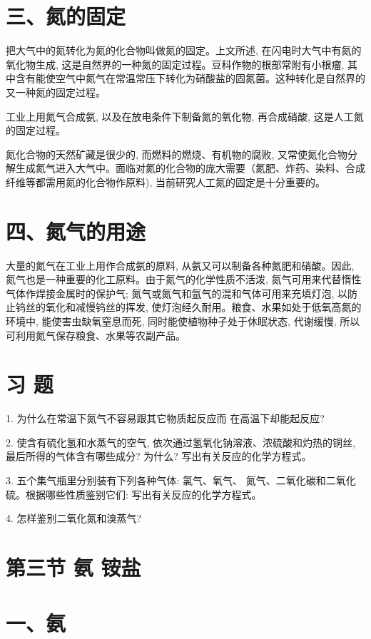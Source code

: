 \documentclass[10pt]{article}
\begin{document}
\section*{三、氮的固定}

把大气中的氮转化为氮的化合物叫做氮的固定。上文所述, 在闪电时大气中有氮的氧化物生成, 这是自然界的一种氮的固定过程。豆科作物的根部常附有小根瘤, 其中含有能使空气中氮气在常温常压下转化为硝酸盐的固氮菌。这种转化是自然界的又一种氮的固定过程。

工业上用氮气合成氨, 以及在放电条件下制备氮的氧化物, 再合成硝酸, 这是人工氮的固定过程。

氮化合物的天然矿藏是很少的, 而燃料的燃烧、有机物的腐败, 又常使氮化合物分解生成氮气进入大气中。面临对氮的化合物的庞大需要（氮肥、炸药、染料、合成纤维等都需用氮的化合物作原料), 当前研究人工氮的固定是十分重要的。

\section*{四、氮气的用途}

大量的氮气在工业上用作合成氨的原料, 从氨又可以制备各种氮肥和硝酸。因此, 氮气也是一种重要的化工原料。由于氮气的化学性质不活泼, 氮气可用来代替惰性气体作焊接金属时的保护气; 氮气或氮气和氩气的混和气体可用来充填灯泡, 以防止钨丝的氧化和减慢钨丝的挥发, 使灯泡经久耐用。粮食、水果如处于低氧高氮的环境中, 能使害虫缺氧窒息而死, 同时能使植物种子处于休眠状态, 代谢缓慢, 所以可利用氮气保存粮食、水果等农副产品。

\section*{习 题}

1. 为什么在常温下氮气不容易跟其它物质起反应而 在高温下却能起反应?

2. 使含有硫化氢和水蒸气的空气, 依次通过氢氧化钠溶液、浓硫酸和灼热的铜丝, 最后所得的气体含有哪些成分? 为什么? 写出有关反应的化学方程式。

3. 五个集气瓶里分别装有下列各种气体: 氯气、氧气、 氮气、二氧化碳和二氧化硫。根据哪些性质鉴别它们: 写出有关反应的化学方程式。

4. 怎样鉴别二氧化氮和溴蒸气?

\section*{第三节 氨 铵盐}

\section*{一、氨}
\end{document}
